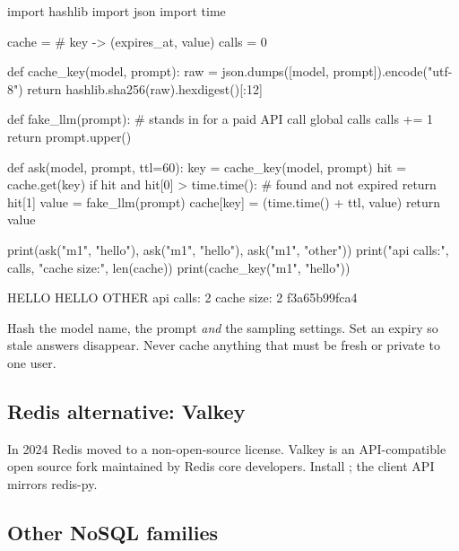 \begin{pycode}
import hashlib
import json
import time

cache = {}                                   # key -> (expires_at, value)
calls = 0

def cache_key(model, prompt):
    raw = json.dumps([model, prompt]).encode("utf-8")
    return hashlib.sha256(raw).hexdigest()[:12]

def fake_llm(prompt):                        # stands in for a paid API call
    global calls
    calls += 1
    return prompt.upper()

def ask(model, prompt, ttl=60):
    key = cache_key(model, prompt)
    hit = cache.get(key)
    if hit and hit[0] > time.time():         # found and not expired
        return hit[1]
    value = fake_llm(prompt)
    cache[key] = (time.time() + ttl, value)
    return value

print(ask("m1", "hello"), ask("m1", "hello"), ask("m1", "other"))
print("api calls:", calls, "cache size:", len(cache))
print(cache_key("m1", "hello"))
\end{pycode}
\begin{rawcode}
HELLO HELLO OTHER
api calls: 2 cache size: 2
f3a65b99fca4
\end{rawcode}

\begin{gamerule}
Hash the model name, the prompt \emph{and} the sampling settings. Set an expiry so stale
answers disappear. Never cache anything that must be fresh or private to one user.
\end{gamerule}

\subsection{Redis alternative: Valkey}

In 2024 Redis moved to a non-open-source license. Valkey is an API-compatible open source
fork maintained by Redis core developers. Install ; the client API
mirrors redis-py.

\subsection{Other NoSQL families}

